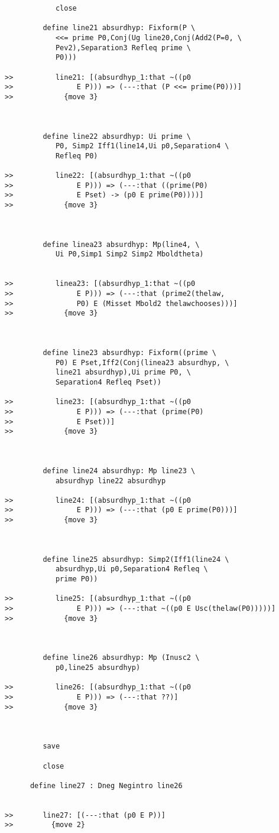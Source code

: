 \documentclass[12pt]{article}
\begin{document}
\begin{verbatim}
            close

         define line21 absurdhyp: Fixform(P \
            <<= prime P0,Conj(Ug line20,Conj(Add2(P=0, \
            Pev2),Separation3 Refleq prime \
            P0)))

>>          line21: [(absurdhyp_1:that ~((p0
>>               E P))) => (---:that (P <<= prime(P0)))]
>>            {move 3}



         define line22 absurdhyp: Ui prime \
            P0, Simp2 Iff1(line14,Ui p0,Separation4 \
            Refleq P0)

>>          line22: [(absurdhyp_1:that ~((p0
>>               E P))) => (---:that ((prime(P0)
>>               E Pset) -> (p0 E prime(P0))))]
>>            {move 3}



         define linea23 absurdhyp: Mp(line4, \
            Ui P0,Simp1 Simp2 Simp2 Mboldtheta)


>>          linea23: [(absurdhyp_1:that ~((p0
>>               E P))) => (---:that (prime2(thelaw,
>>               P0) E (Misset Mbold2 thelawchooses)))]
>>            {move 3}



         define line23 absurdhyp: Fixform((prime \
            P0) E Pset,Iff2(Conj(linea23 absurdhyp, \
            line21 absurdhyp),Ui prime P0, \
            Separation4 Refleq Pset))

>>          line23: [(absurdhyp_1:that ~((p0
>>               E P))) => (---:that (prime(P0)
>>               E Pset))]
>>            {move 3}



         define line24 absurdhyp: Mp line23 \
            absurdhyp line22 absurdhyp

>>          line24: [(absurdhyp_1:that ~((p0
>>               E P))) => (---:that (p0 E prime(P0)))]
>>            {move 3}



         define line25 absurdhyp: Simp2(Iff1(line24 \
            absurdhyp,Ui p0,Separation4 Refleq \
            prime P0))

>>          line25: [(absurdhyp_1:that ~((p0
>>               E P))) => (---:that ~((p0 E Usc(thelaw(P0)))))]
>>            {move 3}



         define line26 absurdhyp: Mp (Inusc2 \
            p0,line25 absurdhyp)

>>          line26: [(absurdhyp_1:that ~((p0
>>               E P))) => (---:that ??)]
>>            {move 3}



         save

         close

      define line27 : Dneg Negintro line26


>>       line27: [(---:that (p0 E P))]
>>         {move 2}


\end{verbatim}
\end{document}
